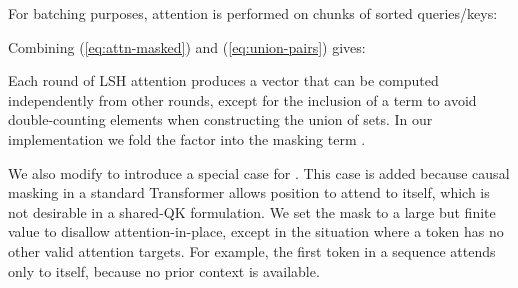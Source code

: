 \documentclass{article} \usepackage{iclr2020_conference,times}
\begin{document}
For batching purposes, attention is performed on chunks of sorted queries/keys:


Combining (\ref{eq:attn-masked}) and (\ref{eq:union-pairs}) gives:


Each round of LSH attention produces a vector  that can be computed independently from other rounds, except for the inclusion of a term  to avoid double-counting elements when constructing the union of  sets. In our implementation we fold the  factor into the masking term .

We also modify  to introduce a special case for .
This case is added because causal masking in a standard Transformer allows position  to attend to itself, which is not desirable in a shared-QK formulation. We set the mask to a large but finite value to disallow attention-in-place, except in the situation where a token has no other valid attention targets. For example, the first token in a sequence attends only to itself, because no prior context is available.
\end{document}
